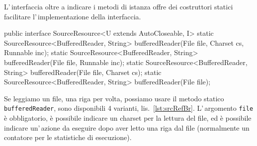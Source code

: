 L'\,interfaccia oltre a indicare i metodi di istanza offre dei costruttori
statici facilitare l'\,implementazione della interfaccia.

\begin{elisting}[!htb]
\begin{javacode}
public interface SourceResource<U extends AutoCloseable, I> {
    static SourceResource<BufferedReader, String> bufferedReader(File file, Charset cs, Runnable inc);
    static SourceResource<BufferedReader, String> bufferedReader(File file, Runnable inc);
    static SourceResource<BufferedReader, String> bufferedReader(File file, Charset cs);
    static SourceResource<BufferedReader, String> bufferedReader(File file);
}
\end{javacode}
\caption{Metodi creare una risorsa \texttt{SourceResource<BufferedReader, String>}}
\label{lst:srcRefBr}
\end{elisting}
Se leggiamo un file, una riga per volta, possiamo usare il metodo statico
\texttt{bufferedReader}, sono disponibili 4 varianti, lis.~\ref{lst:srcRefBr}.
L'\,argomento \texttt{file} è obbligatorio, è possibile indicare un charset per
la lettura del file, ed è possibile indicare un'\,azione da eseguire dopo aver
letto una riga dal file (normalmente un contatore per le statistiche di
esecuzione).

